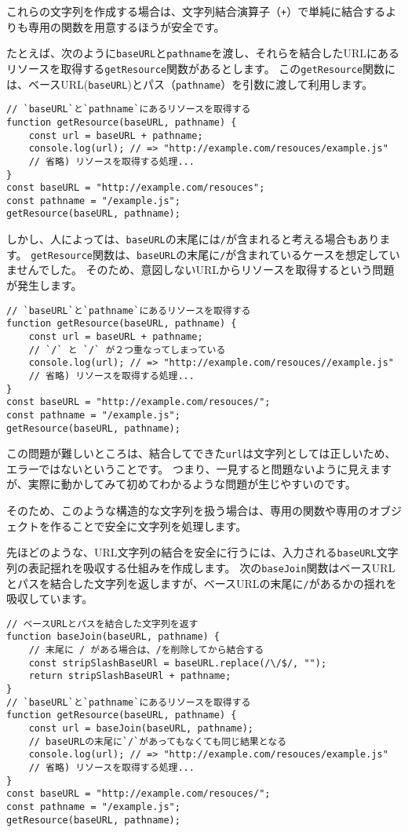 これらの文字列を作成する場合は、文字列結合演算子（\texttt{+}）で単純に結合するよりも専用の関数を用意するほうが安全です。

たとえば、次のように\texttt{baseURL}と\texttt{pathname}を渡し、それらを結合したURLにあるリソースを取得する\texttt{getResource}関数があるとします。
この\texttt{getResource}関数には、ベースURL(\texttt{baseURL})とパス（\texttt{pathname}）を引数に渡して利用します。

\begin{lstlisting}
// `baseURL`と`pathname`にあるリソースを取得する
function getResource(baseURL, pathname) {
    const url = baseURL + pathname;
    console.log(url); // => "http://example.com/resouces/example.js"
    // 省略) リソースを取得する処理...
}
const baseURL = "http://example.com/resouces";
const pathname = "/example.js";
getResource(baseURL, pathname);
\end{lstlisting}

しかし、人によっては、\texttt{baseURL}の末尾には\texttt{/}が含まれると考える場合もあります。
\texttt{getResource}関数は、\texttt{baseURL}の末尾に\texttt{/}が含まれているケースを想定していませんでした。
そのため、意図しないURLからリソースを取得するという問題が発生します。

\begin{lstlisting}
// `baseURL`と`pathname`にあるリソースを取得する
function getResource(baseURL, pathname) {
    const url = baseURL + pathname;
    // `/` と `/` が２つ重なってしまっている
    console.log(url); // => "http://example.com/resouces//example.js"
    // 省略) リソースを取得する処理...
}
const baseURL = "http://example.com/resouces/";
const pathname = "/example.js";
getResource(baseURL, pathname);
\end{lstlisting}

この問題が難しいところは、結合してできた\texttt{url}は文字列としては正しいため、エラーではないということです。
つまり、一見すると問題ないように見えますが、実際に動かしてみて初めてわかるような問題が生じやすいのです。

そのため、このような構造的な文字列を扱う場合は、専用の関数や専用のオブジェクトを作ることで安全に文字列を処理します。

先ほどのような、URL文字列の結合を安全に行うには、入力される\texttt{baseURL}文字列の表記揺れを吸収する仕組みを作成します。
次の\texttt{baseJoin}関数はベースURLとパスを結合した文字列を返しますが、ベースURLの末尾に\texttt{/}があるかの揺れを吸収しています。

\begin{lstlisting}
// ベースURLとパスを結合した文字列を返す
function baseJoin(baseURL, pathname) {
    // 末尾に / がある場合は、/を削除してから結合する
    const stripSlashBaseURl = baseURL.replace(/\/$/, "");
    return stripSlashBaseURl + pathname;
}
// `baseURL`と`pathname`にあるリソースを取得する
function getResource(baseURL, pathname) {
    const url = baseJoin(baseURL, pathname);
    // baseURLの末尾に`/`があってもなくても同じ結果となる
    console.log(url); // => "http://example.com/resouces/example.js"
    // 省略) リソースを取得する処理...
}
const baseURL = "http://example.com/resouces/";
const pathname = "/example.js";
getResource(baseURL, pathname);
\end{lstlisting}

